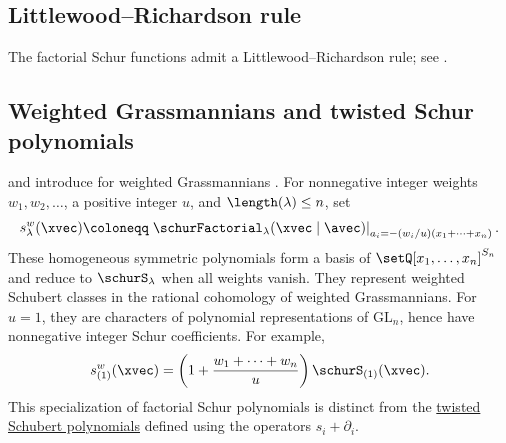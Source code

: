 \subsection[schurFactorialLR]{Littlewood--Richardson rule}

The factorial Schur functions admit a Littlewood--Richardson rule; see
\cite{MolevSagan1999}.

\subsection[weightedSchur]{Weighted Grassmannians and twisted Schur polynomials}

 and  introduce
 for weighted Grassmannians
\cite{AbeMatsumura2015}. For nonnegative integer weights
$w_1,w_2,\dotsc$, a positive integer $u$, and $\length(\lambda)\leq n$, set
\[
 s^w_\lambda(\xvec)
 \coloneqq
 \left.\schurFactorial_\lambda(\xvec\mid\avec)
 \right|_{a_i=-(w_i/u)(x_1+\dotsb+x_n)}.
\]
These homogeneous symmetric polynomials form a basis of
$\setQ[x_1,\dotsc,x_n]^{S_n}$ and reduce to $\schurS_\lambda$
when all weights vanish. They represent weighted Schubert classes
in the rational cohomology of weighted Grassmannians.
For $u=1$, they are characters of polynomial representations of
$\mathrm{GL}_n$, hence have nonnegative integer Schur coefficients.
For example,
\[
 s^w_{(1)}(\xvec)
 =\left(1+\frac{w_1+\dotsb+w_n}{u}\right)\schurS_{(1)}(\xvec).
\]
This specialization of factorial Schur polynomials is distinct from the
\hyperref[schubertTwisted]{twisted Schubert polynomials}
defined using the operators $s_i+\partial_i$.
